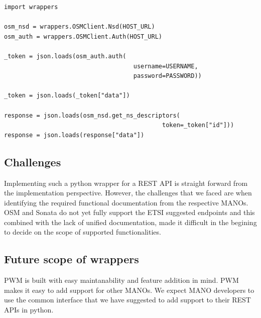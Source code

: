 \begin{lstlisting}[caption=Code to fetch all NSDs in OSM, label=lis:osmnsd]
import wrappers

osm_nsd = wrappers.OSMClient.Nsd(HOST_URL)
osm_auth = wrappers.OSMClient.Auth(HOST_URL)

_token = json.loads(osm_auth.auth(
									username=USERNAME,
									password=PASSWORD))

_token = json.loads(_token["data"])

response = json.loads(osm_nsd.get_ns_descriptors(
											token=_token["id"]))
response = json.loads(response["data"])
\end{lstlisting}

\subsection{Challenges}

Implementing such a python wrapper for a REST API is straight forward from the implementation perspective. 
However, the challenges that we faced are when identifying the required functional documentation from the respective MANOs. 
OSM and Sonata do not yet fully support the ETSI suggested endpoints and this combined with the lack of unified documentation, made it difficult in the begining to decide on the scope of supported functionalities.\\
  

\subsection{Future scope of wrappers}

PWM is built with easy maintanability and feature addition in mind. 
PWM makes it easy to add support for other MANOs. 
We expect MANO developers to use the common interface that we have suggested to add support to their REST APIs in python.

 
